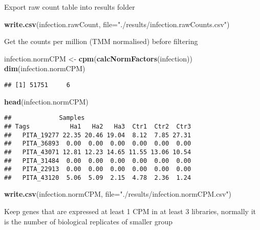 \documentclass[
]{article}
\newenvironment{Shaded}{\begin{snugshade}}{\end{snugshade}}
\newcommand{\AttributeTok}[1]{\textcolor[rgb]{0.13,0.29,0.53}{#1}}
\newcommand{\FunctionTok}[1]{\textcolor[rgb]{0.13,0.29,0.53}{\textbf{#1}}}
\newcommand{\NormalTok}[1]{#1}
\newcommand{\OtherTok}[1]{\textcolor[rgb]{0.56,0.35,0.01}{#1}}
\newcommand{\StringTok}[1]{\textcolor[rgb]{0.31,0.60,0.02}{#1}}
\begin{document}
Export raw count table into results folder

\begin{Shaded}
\begin{Highlighting}[]
\FunctionTok{write.csv}\NormalTok{(infection.rawCount, }\AttributeTok{file=}\StringTok{"./results/infection.rawCounts.csv"}\NormalTok{)}
\end{Highlighting}
\end{Shaded}

Get the counts per million (TMM normalised) before filtering

\begin{Shaded}
\begin{Highlighting}[]
\NormalTok{infection.normCPM }\OtherTok{\textless{}{-}} \FunctionTok{cpm}\NormalTok{(}\FunctionTok{calcNormFactors}\NormalTok{(infection))}
\FunctionTok{dim}\NormalTok{(infection.normCPM)}
\end{Highlighting}
\end{Shaded}

\begin{verbatim}
## [1] 51751     6
\end{verbatim}

\begin{Shaded}
\begin{Highlighting}[]
\FunctionTok{head}\NormalTok{(infection.normCPM)}
\end{Highlighting}
\end{Shaded}

\begin{verbatim}
##             Samples
## Tags           Ha1   Ha2   Ha3  Ctr1  Ctr2  Ctr3
##   PITA_19277 22.35 20.46 19.04  8.12  7.85 27.31
##   PITA_36893  0.00  0.00  0.00  0.00  0.00  0.00
##   PITA_43071 12.81 12.23 14.65 11.55 13.06 10.54
##   PITA_31484  0.00  0.00  0.00  0.00  0.00  0.00
##   PITA_22913  0.00  0.00  0.00  0.00  0.00  0.00
##   PITA_43120  5.06  5.09  2.15  4.78  2.36  1.24
\end{verbatim}

\begin{Shaded}
\begin{Highlighting}[]
\FunctionTok{write.csv}\NormalTok{(infection.normCPM, }\AttributeTok{file=}\StringTok{"./results/infection.normCPM.csv"}\NormalTok{)}
\end{Highlighting}
\end{Shaded}

Keep genes that are expressed at least 1 CPM in at least 3 libraries,
normally it is the number of biological replicates of smaller group
\end{document}
